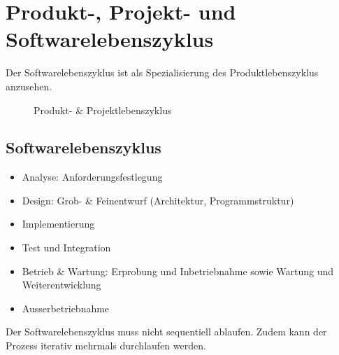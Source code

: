 \section{Produkt-, Projekt- und Softwarelebenszyklus}
Der Softwarelebenszyklus ist als Spezialisierung des Produktlebenszyklus anzusehen.
\begin{figure}[ht]
    \centering
    \caption[]{Produkt- \& Projektlebenszyklus}
\end{figure}


\subsection{Softwarelebenszyklus}
\begin{itemize}
    \item Analyse: Anforderungsfestlegung
    \item Design: Grob- \& Feinentwurf (Architektur, Programmstruktur)
    \item Implementierung
    \item Test und Integration
    \item Betrieb \& Wartung: Erprobung und Inbetriebnahme sowie Wartung und Weiterentwicklung
    \item Ausserbetriebnahme
\end{itemize}
Der Softwarelebenszyklus muss nicht sequentiell ablaufen. Zudem kann der Prozess iterativ mehrmals durchlaufen werden. 

